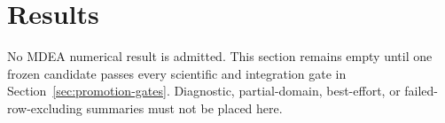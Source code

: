 \section{Results}

No MDEA numerical result is admitted. This section remains empty until one frozen candidate
passes every scientific and integration gate in Section~\ref{sec:promotion-gates}. Diagnostic,
partial-domain, best-effort, or failed-row-excluding summaries must not be placed here.
